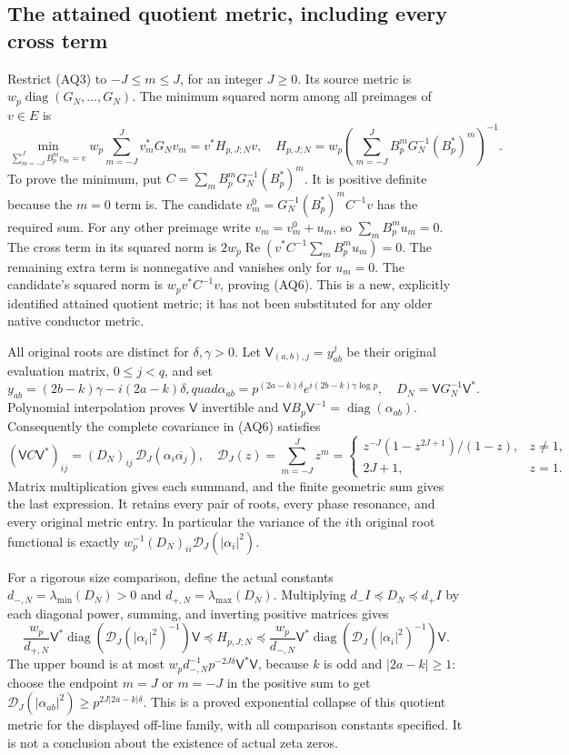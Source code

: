 \subsection{The attained quotient metric, including every cross term}
Restrict (AQ3) to $-J\le m\le J$, for an integer $J\ge0$. Its
source metric is $w_p\operatorname{diag}(G_N,\ldots,G_N)$.
The minimum squared norm among all preimages of $v\in E$ is
\[
 \min_{\sum_{m=-J}^J B_p^mv_m=v}
      w_p\sum_{m=-J}^Jv_m^*G_Nv_m
  =v^*H_{p,J;N}v,
 \quad
 H_{p,J;N}=w_p\left(
   \sum_{m=-J}^J B_p^mG_N^{-1}(B_p^*)^m\right)^{-1}.
 \tag{AQ6}
\]
To prove the minimum, put $C=\sum_mB_p^mG_N^{-1}(B_p^*)^m$.
It is positive definite because the $m=0$ term is. The candidate
$v_m^0=G_N^{-1}(B_p^*)^m C^{-1}v$ has the required sum. For any
other preimage write $v_m=v_m^0+u_m$, so $\sum_mB_p^mu_m=0$.
The cross term in its squared norm is
$2w_p\operatorname{Re}(v^*C^{-1}\sum_mB_p^mu_m)=0$.
The remaining extra term is nonnegative and vanishes only for $u_m=0$.
The candidate's squared norm is $w_pv^*C^{-1}v$, proving (AQ6).
This is a new, explicitly identified attained quotient metric; it has
not been substituted for any older native conductor metric.

All original roots are distinct for $\delta,\gamma>0$. Let
$\mathsf V_{(a,b),j}=y_{ab}^j$ be their original evaluation matrix,
$0\le j<q$, and set
\[
 y_{ab}=(2b-k)\gamma-i(2a-k)\delta,quad
 \alpha_{ab}=p^{(2a-k)\delta}e^{i(2b-k)\gamma\log p},\quad
 D_N=\mathsf V G_N^{-1}\mathsf V^*.
 \tag{AQ7}
\]
Polynomial interpolation proves $\mathsf V$ invertible and
$\mathsf V B_p\mathsf V^{-1}=\operatorname{diag}(\alpha_{ab})$.
Consequently the complete covariance in (AQ6) satisfies
\[
 (\mathsf V C\mathsf V^*)_{ij}
   =(D_N)_{ij}\,\mathcal D_J(\alpha_i\overline{\alpha_j}),
 \quad
 \mathcal D_J(z)=\sum_{m=-J}^J z^m
 =\begin{cases}
 z^{-J}(1-z^{2J+1})/(1-z),&z\ne1,\\
 2J+1,&z=1.
 \end{cases}
 \tag{AQ8}
\]
Matrix multiplication gives each summand, and the finite geometric sum
gives the last expression. It retains every pair of roots, every
phase resonance, and every original metric entry. In particular the
variance of the $i$th original root functional is exactly
$w_p^{-1}(D_N)_{ii}\mathcal D_J(|\alpha_i|^2)$.

For a rigorous size comparison, define the actual constants
$d_{-,N}=\lambda_{\min}(D_N)>0$ and
$d_{+,N}=\lambda_{\max}(D_N)$. Multiplying
$d_-I\preceq D_N\preceq d_+I$ by each diagonal power, summing, and
inverting positive matrices gives
\[
 \frac{w_p}{d_{+,N}}\mathsf V^*
   \operatorname{diag}(\mathcal D_J(|\alpha_i|^2)^{-1})\mathsf V
 \preceq H_{p,J;N}\preceq
 \frac{w_p}{d_{-,N}}\mathsf V^*
   \operatorname{diag}(\mathcal D_J(|\alpha_i|^2)^{-1})\mathsf V.
 \tag{AQ9}
\]
The upper bound is at most
$w_pd_{-,N}^{-1}p^{-2J\delta}\mathsf V^*\mathsf V$, because $k$
is odd and $|2a-k|\ge1$: choose the endpoint $m=J$ or $m=-J$ in
the positive sum to get
$\mathcal D_J(|\alpha_{ab}|^2)\ge p^{2J|2a-k|\delta}$.
This is a proved exponential collapse of this quotient metric for the
displayed off-line family, with all comparison constants specified.
It is not a conclusion about the existence of actual zeta zeros.

